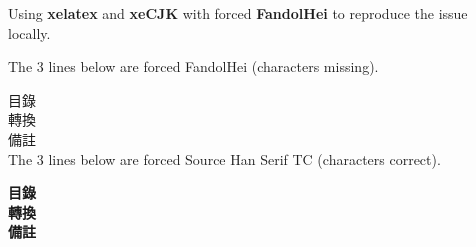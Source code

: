 \documentclass[a4, 10pt]{article}
\begin{document}
Using \textbf{xelatex} and \textbf{xeCJK} with forced \textbf{FandolHei} to reproduce the issue locally.\newline

The 3 lines below are forced FandolHei (characters missing).\newline

目錄\\

轉換\\

備註\\

The 3 lines below are forced Source Han Serif TC (characters correct).\newline

\textbf{目錄}\\

\textbf{轉換}\\

\textbf{備註}\\
\end{document}
